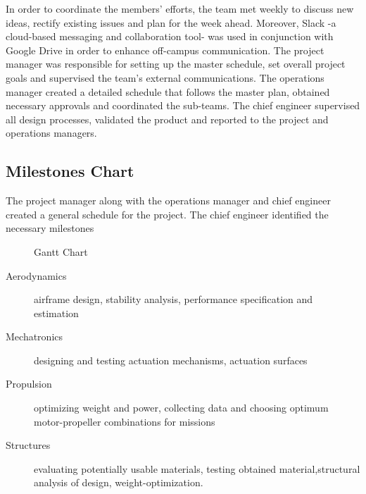 In order to coordinate the members' efforts, the team met weekly to discuss new ideas, rectify existing issues and plan for the week ahead. Moreover, Slack -a cloud-based messaging and collaboration tool- was used in conjunction with Google Drive in order to enhance off-campus communication. The project manager was responsible for setting up the master schedule, set overall project goals and supervised the team's external communications. The operations manager created a detailed schedule that follows the master plan, obtained necessary approvals and coordinated the sub-teams. The chief engineer supervised all design processes, validated the product and reported to the project and operations managers.

\subsection{Milestones Chart}

The project manager along with the operations manager and chief engineer created a general schedule for the project. The chief engineer identified the necessary milestones 

\begin{figure}[H]
    \centering
    
    \label{fig:gantt}
    \caption{Gantt Chart}
\end{figure}   


\begin{description}
    \item [Aerodynamics] airframe design, stability analysis, performance specification and estimation
    \item [Mechatronics] designing and testing actuation mechanisms, actuation surfaces
    \item [Propulsion] optimizing weight and power, collecting data and choosing optimum motor-propeller combinations for missions
    \item [Structures] evaluating potentially usable materials, testing obtained material,structural analysis of design, weight-optimization.
\end{description}